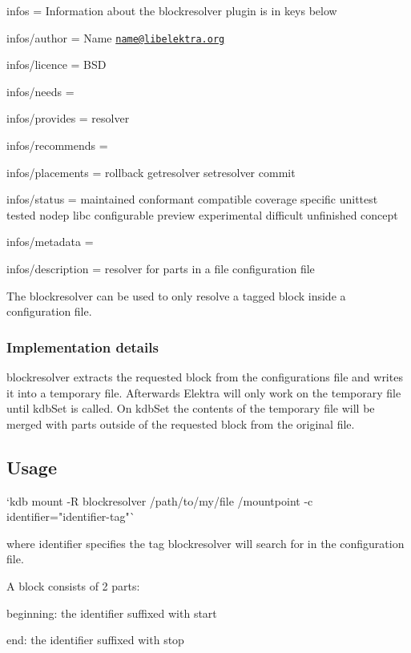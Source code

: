
\begin{DoxyItemize}
\item infos = Information about the blockresolver plugin is in keys below
\item infos/author = Name \href{mailto:name@libelektra.org}{\tt name@libelektra.\+org}
\item infos/licence = B\+S\+D
\item infos/needs =
\item infos/provides = resolver
\item infos/recommends =
\item infos/placements = rollback getresolver setresolver commit
\item infos/status = maintained conformant compatible coverage specific unittest tested nodep libc configurable preview experimental difficult unfinished concept
\item infos/metadata =
\item infos/description = resolver for parts in a file configuration file
\end{DoxyItemize}

The {\ttfamily blockresolver} can be used to only resolve a tagged block inside a configuration file.

\subsubsection*{Implementation details}

{\ttfamily blockresolver} extracts the requested block from the configurations file and writes it into a temporary file. Afterwards Elektra will only work on the temporary file until kdb\+Set is called. On kdb\+Set the contents of the temporary file will be merged with parts outside of the requested block from the original file.

\subsection*{Usage}

\begin{DoxyVerb}`kdb mount -R blockresolver /path/to/my/file /mountpoint -c identifier="identifier-tag"`
\end{DoxyVerb}


where {\ttfamily identifier} specifies the tag {\ttfamily blockresolver} will search for in the configuration file.

A block consists of 2 parts\+:
\begin{DoxyItemize}
\item beginning\+: the identifier suffixed with {\ttfamily start}
\item end\+: the identifier suffixed with {\ttfamily stop}
\end{DoxyItemize}

